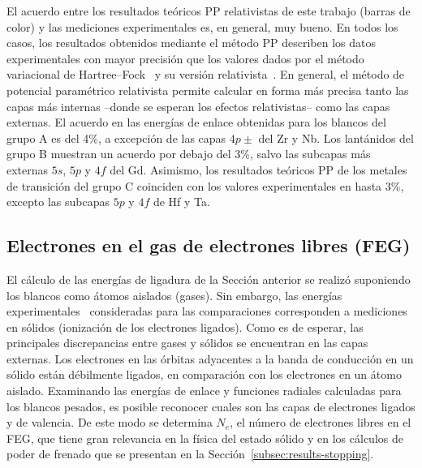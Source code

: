 El acuerdo entre los resultados teóricos PP relativistas de este trabajo 
(barras de color) y las mediciones experimentales es, en general, muy 
bueno. En todos los casos, los resultados obtenidos mediante el método 
PP describen los datos experimentales con mayor precisión que los 
valores dados por el método variacional de 
Hartree--Fock~\cite{FroeseFischer:97} y su versión 
relativista~\cite{Desclaux:73}. En general, el método de potencial 
paramétrico relativista permite calcular en forma más precisa tanto las 
capas más internas --donde se esperan los efectos relativistas-- como 
las capas externas. El acuerdo en las energías de enlace obtenidas para 
los blancos del grupo A es del 4\%, a excepción de las capas $4p\pm$ del 
Zr y Nb. Los lantánidos del grupo B muestran un acuerdo por debajo del 
3\%, salvo las subcapas más externas $5s$, $5p$ y $4f$ del Gd. Asimismo, 
los resultados teóricos PP de los metales de transición del grupo C 
coinciden con los valores experimentales en hasta 3\%, excepto las 
subcapas $5p$ y $4f$ de Hf y Ta. 

\subsection{Electrones en el gas de electrones libres (FEG)}
\label{subsec:FEG}

El cálculo de las energías de ligadura de la Sección anterior se realizó 
suponiendo los blancos como átomos aislados (gases). Sin embargo, las 
energías experimentales~\cite{Williams:95} consideradas para las 
comparaciones corresponden a mediciones en sólidos (ionización de los 
electrones ligados). Como es de esperar, las principales discrepancias 
entre gases y sólidos se encuentran en las capas externas. Los 
electrones en las órbitas adyacentes a la banda de conducción en un 
sólido están débilmente ligados, en comparación con los electrones en un 
átomo aislado. Examinando las energías de enlace y funciones radiales 
calculadas para los blancos pesados, es posible reconocer cuales son las 
capas de electrones ligados y de valencia. De este modo se determina 
$N_e$, el número de electrones libres en el FEG, que tiene gran 
relevancia en la física del estado sólido y en los cálculos de poder 
de frenado que se presentan en la Sección~\ref{subsec:results-stopping}.

